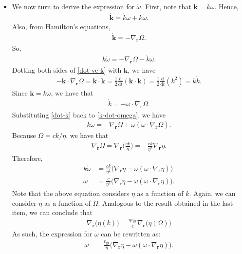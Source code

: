 \documentclass[10pt]{article}
\newcommand{\dee}{\mathrm{d}}
\newcommand{\ve}[1]{\mathbf{#1}}
\newcommand{\group}{\mathrm{gr}}
\begin{document}
\begin{itemize}
    \item We now turn to derive the expression for $\dot\omega$. First, note that $\ve{k} = k \omega$. Hence,
    \begin{align*}
      \dot{\ve{k}} = \dot k \omega + k \dot \omega.
    \end{align*}
    Also, from Hamilton's equations,
    \begin{align}
      \dot{\ve{k}} = -\nabla_{\ve{r}}\Omega. \label{dot-ve-k}
    \end{align}
    So,
    \begin{align}
      k \dot\omega = -\nabla_{\ve{r}}\Omega - \dot k \omega. \label{k-dot-omega}
    \end{align}
    Dotting both sides of \ref{dot-ve-k} with $\ve{k}$, we have
    \begin{align*}
      -\ve{k} \cdot \nabla_{\ve{r}} \Omega 
      = \ve{k} \cdot \dot{\ve{k}} 
      = \frac{1}{2} \frac{\dee}{\dee t}(\ve{k} \cdot \ve{k})
      = \frac{1}{2} \frac{\dee}{\dee t}(k^2)
      = k\dot k.
    \end{align*}
    Since $\ve{k} = k\omega$, we have that
    \begin{align}
      \dot k = -\omega \cdot \nabla_{\ve{r}}\Omega. \label{dot-k}
    \end{align}
    Substituting \ref{dot-k} back to \ref{k-dot-omega}, we have
    \begin{align*}
      k \dot \omega = -\nabla_{\ve{r}}\Omega + \omega(\omega \cdot \nabla_{\ve{r}}\Omega).
    \end{align*}
    Because $\Omega = ck/\eta$, we have that
    \begin{align*}
      \nabla_{\ve{r}}\Omega = \nabla_{\ve{r}} \bigg( \frac{ck}{\eta} \bigg) = -\frac{ck}{\eta^2}\nabla_{\ve{r}}\eta.
    \end{align*}
    Therefore,
    \begin{align*}
      k \dot \omega 
      &= \frac{ck}{\eta^2} \big( \nabla_{\ve{r}}\eta - \omega(\omega \cdot \nabla_{\ve{r}}\eta)\big) \\
      \dot \omega 
      &= \frac{c}{\eta^2} \big( \nabla_{\ve{r}}\eta - \omega(\omega \cdot \nabla_{\ve{r}}\eta)\big).
    \end{align*}
    Note that the above equation considers $\eta$ as a function of $k$. Again, we can consider $\eta$ as a function of $\Omega$. Analogous to the result obtained in the last item, we can conclude that
    \begin{align*}
      \nabla_{\ve{r}} \big( \eta(k) \big) = \frac{\eta v_\group}{c} \nabla_{\ve{r}} \big( \eta(\Omega) \big)
    \end{align*}
    As such, the expression for $\dot\omega$ can be rewritten as:
    \begin{align*}
      \dot \omega 
      &= \frac{v_\group}{\eta} \big( \nabla_{\ve{r}}\eta - \omega(\omega \cdot \nabla_{\ve{r}}\eta)\big).
    \end{align*}


\end{itemize}
\end{document}
